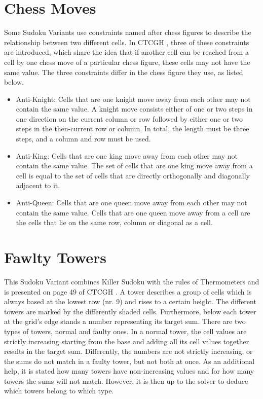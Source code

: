 \section{Chess Moves}
Some Sudoku Variants use constraints named after chess figures to describe the relationship between two different cells. In CTCGH \cite{CrackingTheCryptic2021}, three of these constraints are introduced, which share the idea that if another cell can be reached from a cell by one chess move of a particular chess figure, these cells may not have the same value. The three constraints differ in the chess figure they use, as listed below.
\begin{itemize}
    \item Anti-Knight: Cells that are one knight move away from each other may not contain the same value. A knight move consists either of one or two steps in one direction on the current column or row followed by either one or two steps in the then-current row or column. In total, the length must be three steps, and a column and row must be used.
    \item Anti-King: Cells that are one king move away from each other may not contain the same value. The set of cells that are one king move away from a cell is equal to the set of cells that are directly orthogonally and diagonally adjacent to it.
    \item Anti-Queen: Cells that are one queen move away from each other may not contain the same value. Cells that are one queen move away from a cell are the cells that lie on the same row, column or diagonal as a cell.
\end{itemize}

\section{Fawlty Towers}
This Sudoku Variant combines Killer Sudoku with the rules of Thermometers and is presented on page 49 of CTCGH \cite{CrackingTheCryptic2021}. A tower describes a group of cells which is always based at the lowest row (nr. 9) and rises to a certain height. The different towers are marked by the differently shaded cells. Furthermore, below each tower at the grid's edge stands a number representing its target sum. There are two types of towers, normal and faulty ones. In a normal tower, the cell values are strictly increasing starting from the base and adding all its cell values together results in the target sum. Differently, the numbers are not strictly increasing, or the sums do not match in a faulty tower, but not both at once. As an additional help, it is stated how many towers have non-increasing values and for how many towers the sums will not match. However, it is then up to the solver to deduce which towers belong to which type.

